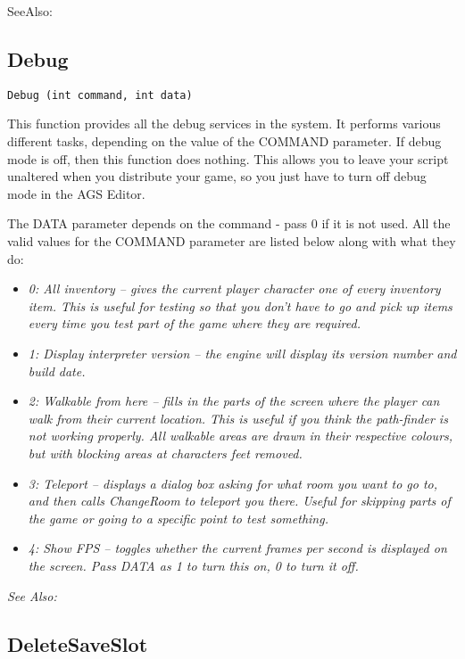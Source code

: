 SeeAlso: 



\subsection{Debug}\label{Debug}%

\begin{verbatim}
Debug (int command, int data)
\end{verbatim}
This function provides all the debug services in the system. It performs
various different tasks, depending on the value of the COMMAND parameter.
If debug mode is off, then this function does nothing. This allows you to
leave your script unaltered when you distribute your game, so you just have
to turn off debug mode in the AGS Editor.

The DATA parameter depends on the command - pass 0 if it is not used.
All the valid values for the COMMAND parameter are listed below along with
what they do:
\begin{itemize}
\item \it{0: All inventory} -- gives the current player character one of every
    inventory item. This is useful for testing so that you don't have to
    go and pick up items every time you test part of the game where they
    are required.
\item \it{1: Display interpreter version} -- the engine will display its version
    number and build date.
\item \it{2: Walkable from here} -- fills in the parts of the screen where the player
    can walk from their current location. This is useful if you think the
    path-finder is not working properly. All walkable areas are drawn in
    their respective colours, but with blocking areas at characters feet
    removed.
\item \it{3: Teleport} -- displays a dialog box asking for what room you want to go
    to, and then calls ChangeRoom to teleport you there. Useful for skipping
    parts of the game or going to a specific point to test something.
\item \it{4: Show FPS} -- toggles whether the current frames per second is displayed
    on the screen. Pass DATA as 1 to turn this on, 0 to turn it off.
\end{itemize}

\it{See Also:} 


\subsection{DeleteSaveSlot}\label{DeleteSaveSlot}%

